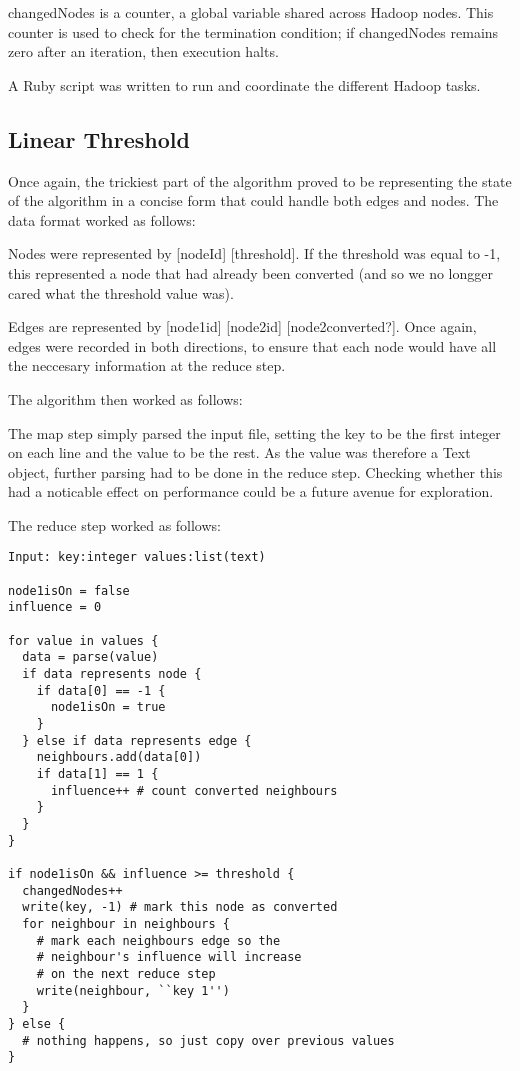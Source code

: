 changedNodes is a counter, a global variable shared across Hadoop nodes. This counter is used to check for the termination condition; if changedNodes remains zero after an iteration, then execution halts.

A Ruby script was written to run and coordinate the different Hadoop tasks.

\subsection{Linear Threshold}

Once again, the trickiest part of the algorithm proved to be representing the state of the algorithm in a concise form that could handle both edges and nodes. The data format worked as follows:

Nodes were represented by [nodeId] [threshold]. If the threshold was equal to -1, this represented a node that had already been converted (and so we no longger cared what the threshold value was).

Edges are represented by [node1id] [node2id] [node2converted?]. Once again, edges were recorded in both directions, to ensure that each node would have all the neccesary information at the reduce step.

The algorithm then worked as follows:

The map step simply parsed the input file, setting the key to be the first integer on each line and the value to be the rest. As the value was therefore a Text object, further parsing had to be done in the reduce step. Checking whether this had a noticable effect on performance could be a future avenue for exploration.

The reduce step worked as follows:

\begin{verbatim}
Input: key:integer values:list(text)

node1isOn = false
influence = 0

for value in values {
  data = parse(value)
  if data represents node {
    if data[0] == -1 {
      node1isOn = true
    }
  } else if data represents edge {
    neighbours.add(data[0])
    if data[1] == 1 {
      influence++ # count converted neighbours
    }
  }
}

if node1isOn && influence >= threshold {
  changedNodes++
  write(key, -1) # mark this node as converted
  for neighbour in neighbours {
  	# mark each neighbours edge so the 
  	# neighbour's influence will increase 
  	# on the next reduce step
    write(neighbour, ``key 1'') 
  }
} else {
  # nothing happens, so just copy over previous values
}
\end{verbatim}

